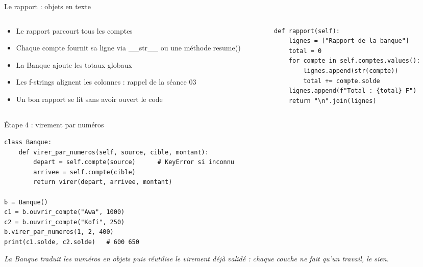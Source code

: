 \documentclass[aspectratio=169,11pt]{beamer}
\begin{document}
\begin{frame}[fragile]{Le rapport : objets en texte}
\begin{columns}[t]
\begin{column}{0.42\textwidth}
\begin{itemize}
  \setlength{\itemsep}{1.5pt}\setlength{\parskip}{0pt}
  \item Le rapport parcourt tous les comptes
  \item Chaque compte fournit sa ligne via \_\_str\_\_ ou une méthode resume()
  \item La Banque ajoute les totaux globaux
  \item Les f-strings alignent les colonnes : rappel de la séance 03
  \item Un bon rapport se lit sans avoir ouvert le code
\end{itemize}
\end{column}
\hspace{0.02\textwidth}
\begin{column}{0.55\textwidth}
\begin{lstlisting}[style=pysmall]
def rapport(self):
    lignes = ["Rapport de la banque"]
    total = 0
    for compte in self.comptes.values():
        lignes.append(str(compte))
        total += compte.solde
    lignes.append(f"Total : {total} F")
    return "\n".join(lignes)
\end{lstlisting}
\end{column}
\end{columns}
\end{frame}

\begin{frame}[fragile]{Étape 4 : virement par numéros}

\begin{lstlisting}[style=py]
class Banque:
    def virer_par_numeros(self, source, cible, montant):
        depart = self.compte(source)      # KeyError si inconnu
        arrivee = self.compte(cible)
        return virer(depart, arrivee, montant)

b = Banque()
c1 = b.ouvrir_compte("Awa", 1000)
c2 = b.ouvrir_compte("Kofi", 250)
b.virer_par_numeros(1, 2, 400)
print(c1.solde, c2.solde)   # 600 650
\end{lstlisting}
\vspace{0.5pt}

{\small\color{PyGris}\itshape La Banque traduit les numéros en objets puis réutilise le virement déjà validé : chaque couche ne fait qu'un travail, le sien.}

\end{frame}
\end{document}
